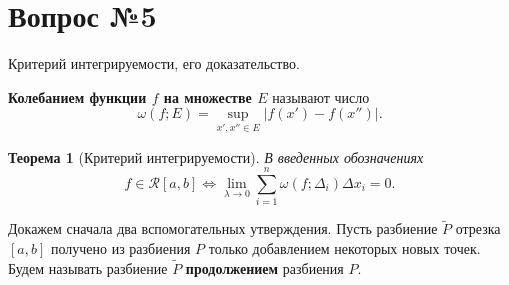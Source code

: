 \documentclass[12pt]{article}
\numberwithin{equation}{section}
\newtheorem{theorem}{Теорема}[section]
\begin{document}
\section{Вопрос №5} %
\begin{framed}
Критерий интегрируемости, его доказательство.
\end{framed}

\textbf{Колебанием функции $f$ на множестве $E$} называют число
\[ \omega(f;E) = \sup_{x', x'' \in E} | f(x') - f(x'') |.\]

\begin{theorem}[Критерий интегрируемости]
В введенных обозначениях
\[ f \in \mathcal{R}[a,b] \iff \lim_{\lambda \to 0} \sum_{i=1}^n \omega(f; \Delta_i) \Delta x_i = 0. \]
\end{theorem}
Докажем сначала два вспомогательных утверждения. Пусть разбиение $\tilde{P}$ отрезка $[a,b]$ получено из разбиения $P$ только добавлением некоторых новых точек. Будем называть разбиение $\tilde{P}$ \textbf{продолжением} разбиения $P$.\\
\end{document}
